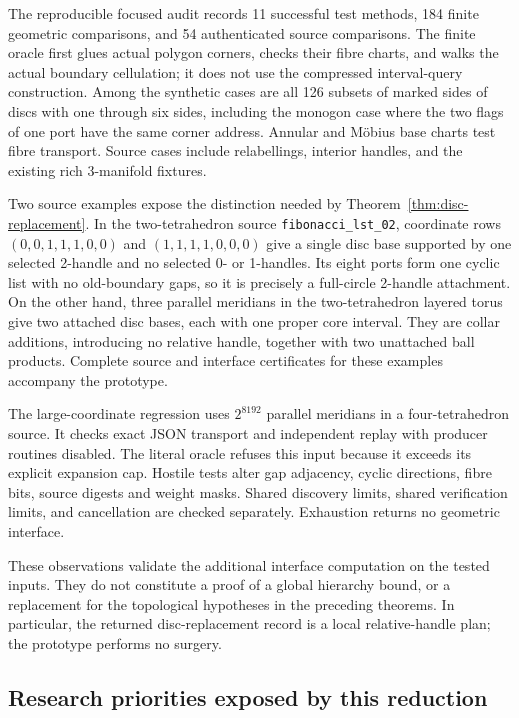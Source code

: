 The reproducible focused audit records 11 successful test methods,
184 finite geometric comparisons, and 54 authenticated source comparisons.
The finite oracle first glues actual polygon corners, checks their fibre
charts, and walks the actual boundary cellulation; it does not use the
compressed interval-query construction.  Among the synthetic cases are
all 126 subsets of marked sides of discs with one through six sides,
including the monogon case where the two flags of one port have the same
corner address.  Annular and M\"obius base charts test fibre transport.
Source cases include relabellings, interior handles, and the existing rich
3-manifold fixtures.

Two source examples expose the distinction needed by
Theorem~\ref{thm:disc-replacement}.  In the two-tetrahedron source
\texttt{fibonacci\_lst\_02}, coordinate rows
$(0,0,1,1,1,0,0)$ and $(1,1,1,1,0,0,0)$ give a single disc base supported
by one selected 2-handle and no selected 0- or 1-handles.  Its eight ports
form one cyclic list with no old-boundary gaps, so it is precisely a
full-circle 2-handle attachment.  On the other hand, three parallel
meridians in the two-tetrahedron layered torus give two attached disc
bases, each with one proper core interval.  They are collar additions,
introducing no relative handle, together with two unattached ball products.
Complete source and interface certificates for these examples accompany
the prototype.

The large-coordinate regression uses $2^{8192}$ parallel meridians in a
four-tetrahedron source.  It checks exact JSON transport and independent
replay with producer routines disabled.  The literal oracle refuses this
input because it exceeds its explicit expansion cap.  Hostile tests alter
gap adjacency, cyclic directions, fibre bits, source digests and weight
masks.  Shared discovery limits, shared verification limits, and cancellation
are checked separately.  Exhaustion returns no geometric interface.

These observations validate the additional interface computation on the
tested inputs.  They do not constitute a proof of a global hierarchy
bound, or a replacement for the topological hypotheses in the preceding
theorems.  In particular, the returned disc-replacement record is a local
relative-handle plan; the prototype performs no surgery.

\subsection{Research priorities exposed by this reduction}

